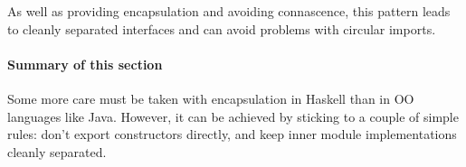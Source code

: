 As well as providing encapsulation and avoiding connascence, this pattern leads to cleanly separated interfaces and can avoid problems with circular imports. 

\paragraph{Summary of this section} Some more care must be taken with encapsulation in Haskell than in OO languages like Java. However, it can be achieved by sticking to a couple of simple rules: don't export constructors directly, and keep inner module implementations cleanly separated.
